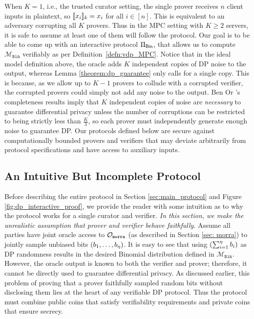When $K=1$, i.e., the trusted curator setting, the single prover receives $n$ client inputs in plaintext, so $\llbracket x_i \rrbracket_k = x_i$ for all $i \in [n]$. 
This is equivalent to an adversary corrupting all $K$ provers. Thus in the MPC setting with $K \geq 2$ servers, it is safe to assume at least one of them will follow the protocol.
Our goal is to be able to come up with an interactive protocol $\Pi_{\mathsf{Bin}}$, 
that allows us to compute $\mathcal{M}_{\texttt{Bin}}$ verifiably as per Definition~\ref{defn:vdp_MPC}. 
Notice that in the ideal model definition above, the oracle adds $K$ independent copies of DP noise to the output, whereas 
 Lemma \ref{theorem:dp_guarantee} only calls for a single copy. 
 This is because, as we allow up to $K-1$ provers to collude with a corrupted verifier, the corrupted provers could simply not add any noise to the output. 
Ben Or \etal's completeness results  \cite{ben2019completeness} imply that $K$ independent copies of noise are \textit{necessary} to guarantee differential privacy unless the number of corruptions can be restricted to being strictly less than $\frac{K}{3}$, so each prover must independently generate enough noise to guarantee DP.
Our protocols defined below are secure against computationally bounded provers and verifiers that may deviate arbitrarily from protocol specifications and have access to auxiliary inputs.

\subsection{An Intuitive But Incomplete Protocol}
\label{sec:intuition}

Before describing the entire protocol in Section \ref{sec:main_protocol} and Figure \ref{fig:dp_interactive_proof}, we provide the reader with some intuition as to why the protocol works for a single curator and verifier. \textit{In this section, we make the unrealistic assumption that prover and verifier behave faithfully}. 
Assume all parties have joint oracle access to $\mathcal{O}_{\mathtt{morra}}$ (as described in Section \ref{sec: morra}) to jointly sample unbiased bits $(b_1, \dots, b_{\eta})$. It is easy to see that using $(\sum_{i=1}^{\eta} b_i)$ as DP randomness results in the desired Binomial distribution defined in $\mathcal{M}_{\texttt{Bin}}$. However, the oracle output is known to both the verifier and prover; therefore, it cannot be directly used to guarantee differential privacy. 
As discussed earlier, this problem of proving that a prover faithfully sampled random bits without disclosing them lies at the heart of any verifiable DP protocol. 
Thus the protocol must combine public coins that satisfy verifiability requirements and private coins that ensure secrecy.

